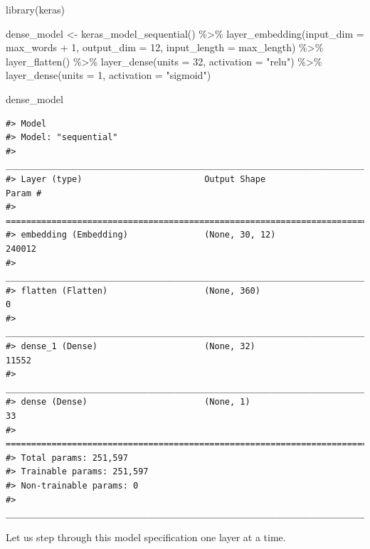 \documentclass[
]{krantz}
\makeatletter
\newenvironment{Shaded}{\begin{snugshade}}{\end{snugshade}}
\newcommand{\AttributeTok}[1]{\textcolor[rgb]{0.77,0.63,0.00}{#1}}
\newcommand{\DecValTok}[1]{\textcolor[rgb]{0.00,0.00,0.81}{#1}}
\newcommand{\FunctionTok}[1]{\textcolor[rgb]{0.00,0.00,0.00}{#1}}
\newcommand{\NormalTok}[1]{#1}
\newcommand{\OtherTok}[1]{\textcolor[rgb]{0.56,0.35,0.01}{#1}}
\newcommand{\SpecialCharTok}[1]{\textcolor[rgb]{0.00,0.00,0.00}{#1}}
\newcommand{\StringTok}[1]{\textcolor[rgb]{0.31,0.60,0.02}{#1}}
\newenvironment{kframe}{%
\medskip{}
\setlength{\fboxsep}{.8em}
 \def\at@end@of@kframe{}%
 \ifinner\ifhmode%
  \def\at@end@of@kframe{\end{minipage}}%
  \begin{minipage}{\columnwidth}%
 \fi\fi%
 \def\FrameCommand##1{\hskip\@totalleftmargin \hskip-\fboxsep
 \colorbox{shadecolor}{##1}\hskip-\fboxsep
     \hskip-\linewidth \hskip-\@totalleftmargin \hskip\columnwidth}%
 \MakeFramed {\advance\hsize-\width
   \@totalleftmargin\z@ \linewidth\hsize
   \@setminipage}}%
 {\par\unskip\endMakeFramed%
 \at@end@of@kframe}
\renewenvironment{Shaded}{\begin{kframe}}{\end{kframe}}
\makeatother
\begin{document}
\begin{Shaded}
\begin{Highlighting}[]
\FunctionTok{library}\NormalTok{(keras)}

\NormalTok{dense\_model }\OtherTok{\textless{}{-}} \FunctionTok{keras\_model\_sequential}\NormalTok{() }\SpecialCharTok{\%\textgreater{}\%}
  \FunctionTok{layer\_embedding}\NormalTok{(}\AttributeTok{input\_dim =}\NormalTok{ max\_words }\SpecialCharTok{+} \DecValTok{1}\NormalTok{,}
                  \AttributeTok{output\_dim =} \DecValTok{12}\NormalTok{,}
                  \AttributeTok{input\_length =}\NormalTok{ max\_length) }\SpecialCharTok{\%\textgreater{}\%}
  \FunctionTok{layer\_flatten}\NormalTok{() }\SpecialCharTok{\%\textgreater{}\%}
  \FunctionTok{layer\_dense}\NormalTok{(}\AttributeTok{units =} \DecValTok{32}\NormalTok{, }\AttributeTok{activation =} \StringTok{"relu"}\NormalTok{) }\SpecialCharTok{\%\textgreater{}\%}
  \FunctionTok{layer\_dense}\NormalTok{(}\AttributeTok{units =} \DecValTok{1}\NormalTok{, }\AttributeTok{activation =} \StringTok{"sigmoid"}\NormalTok{)}

\NormalTok{dense\_model}
\end{Highlighting}
\end{Shaded}

\begin{verbatim}
#> Model
#> Model: "sequential"
#> ________________________________________________________________________________
#> Layer (type)                        Output Shape                    Param #     
#> ================================================================================
#> embedding (Embedding)               (None, 30, 12)                  240012      
#> ________________________________________________________________________________
#> flatten (Flatten)                   (None, 360)                     0           
#> ________________________________________________________________________________
#> dense_1 (Dense)                     (None, 32)                      11552       
#> ________________________________________________________________________________
#> dense (Dense)                       (None, 1)                       33          
#> ================================================================================
#> Total params: 251,597
#> Trainable params: 251,597
#> Non-trainable params: 0
#> ________________________________________________________________________________
\end{verbatim}

Let us step through this model specification one layer at a time.
\end{document}
